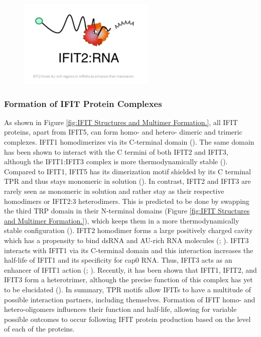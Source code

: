 \begin{figure}
    \centering
    \includegraphics[width=0.25\linewidth]{04. Introduction//Figs/IFIT2-rna-binding.png}
    
    
\end{figure}




\subsubsection{Formation of IFIT Protein Complexes} \label{Formation of IFIT Protein Complexes}
As shown in Figure \ref{fig:IFIT Structures and Multimer Formation.}, all IFIT proteins, apart from IFIT5, can form homo- and hetero- dimeric and trimeric complexes. IFIT1 homodimerizes via its C-terminal domain (\cite{Abbas2013StructuralProteins}). The same domain has been shown to interact with the C termini of both IFIT2 and IFIT3, although the IFIT1:IFIT3 complex is more thermodynamically stable (\cite{Fleith2018IFIT3RNA}). Compared to IFIT1, IFIT5 has its dimerization motif shielded by its C terminal TPR and thus stays monomeric in solution (\cite{Kumar2014InhibitionMRNAs}). In contrast, IFIT2 and IFIT3 are rarely seen as monomeric in solution and rather stay as their respective homodimers or IFIT2:3 heterodimers. This is predicted to be done by swapping the third TRP domain in their N-terminal domains (Figure \ref{fig:IFIT Structures and Multimer Formation.}), which keeps them in a more thermodynamically stable configuration (\cite{Yang2012CrystalMechanisms}). IFIT2 homodimer forms a large positively charged cavity which has a propensity to bind dsRNA and AU-rich RNA molecules (\cite{Vladimer2014IFITs:Proteins}; \cite{Yang2012CrystalMechanisms}). IFIT3 interacts with IFIT1 via its C-terminal domain and this interaction increases the half-life of IFIT1 and its specificity for cap0 RNA. Thus, IFIT3 acts as an enhancer of IFIT1 action (\cite{Fleith2018IFIT3RNA}; \cite{Johnson2018HumanStability}). Recently, it has been shown that IFIT1, IFIT2, and IFIT3 form a heterotrimer, although the precise function of this complex has yet to be elucidated (\cite{Fleith2018IFIT3RNA}). In summary, TPR motifs allow IFITs to have a multitude of possible interaction partners, including themselves. Formation of IFIT homo- and hetero-oligomers influences their function and half-life, allowing for variable possible outcomes to occur following IFIT protein production based on the level of each of the proteins. 

